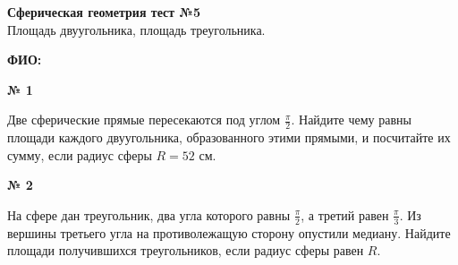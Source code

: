 


    \begin{center}
        \textbf{Сферическая геометрия тест №5}\\
        Площадь двуугольника, площадь треугольника.
    \end{center}

    \textbf{ФИО:}

    \begin{center}
        \textbf{№ 1}
    \end{center}

     Две сферические прямые пересекаются под углом $\frac{\pi}{2}$.
    Найдите чему равны площади каждого двуугольника, образованного этими прямыми, и посчитайте их сумму,
    если радиус сферы $R=52$ см.

    \begin{center}
        \textbf{№ 2}
    \end{center}

    На сфере дан треугольник, два угла которого равны $\frac{\pi}{2}$, а третий равен $\frac{\pi}{3}$.
    Из вершины третьего угла на противолежащую сторону опустили медиану.
    Найдите площади получившихся треугольников, если радиус сферы равен $R$.


